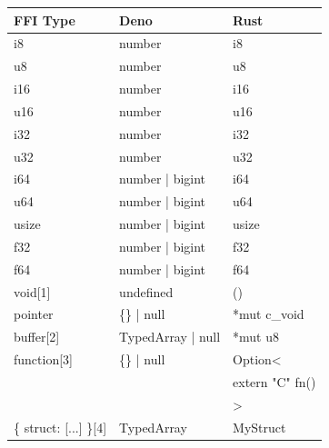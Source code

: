 \documentclass[10pt,journal,compsoc]{IEEEtran}
\begin{document}
\begin{table}[H]
    \begin{tabular}{|l|l|l|}
        \hline
        \textbf{FFI Type}              & \textbf{Deno}     & \textbf{Rust}     \\ \hline
        i8                             & number            & i8                \\ \hline
        u8                             & number            & u8                \\ \hline
        i16                            & number            & i16               \\ \hline
        u16                            & number            & u16               \\ \hline
        i32                            & number            & i32               \\ \hline
        u32                            & number            & u32               \\ \hline
        i64                            & number | bigint   & i64               \\ \hline
        u64                            & number | bigint   & u64               \\ \hline
        usize                          & number | bigint   & usize             \\ \hline
        f32                            & number | bigint   & f32               \\ \hline
        f64                            & number | bigint   & f64               \\ \hline
        void{[}1{]}                    & undefined         & ()                \\ \hline
        pointer                        & \{\} | null       & *mut c\_void      \\ \hline
        buffer{[}2{]}                  & TypedArray | null & *mut u8           \\ \hline
        function{[}3{]}                & \{\} | null       & Option\textless{} \\
                                       &                   & extern "C" fn()   \\
                                       &                   & \textgreater{}    \\ \hline
        \{ struct: {[}...{]} \}{[}4{]} & TypedArray        & MyStruct          \\ \hline
    \end{tabular}
\end{table}
\end{document}
